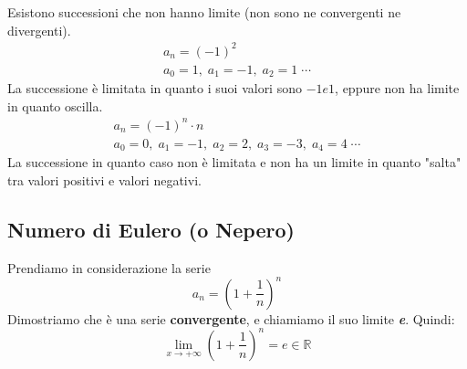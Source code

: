 

Esistono successioni che non hanno limite (non sono ne convergenti ne divergenti).
\begin{gather*}
    a_n = (-1)^2\\
    a_0 = 1,\; a_1 = -1,\; a_2 = 1 \;\cdots
\end{gather*}
La successione è limitata in quanto i suoi valori sono $-1 e 1$, eppure non ha limite in quanto oscilla.
\begin{gather*}
    a_n = (-1)^n \cdot n\\
    a_0 = 0,\; a_1 = -1,\; a_2 = 2,\; a_3 = -3,\; a_4 = 4 \;\cdots
\end{gather*}
La successione in quanto caso non è limitata e non ha un limite in quanto "salta" tra valori positivi e valori negativi.

\subsection{Numero di Eulero (o Nepero)} \label{sec_numeroDiEulero}
Prendiamo in considerazione la serie
\begin{equation*}
    a_n = \left(1+\dfrac{1}{n} \right)^n
\end{equation*}
Dimostriamo che è una serie \textbf{convergente}, e chiamiamo il suo limite \textbf{\textit{e}}. Quindi:
\begin{equation*}
    \lim_{x\to +\infty} \left(1+\dfrac{1}{n}\right)^n = e \in \mathbb{R}
\end{equation*}

